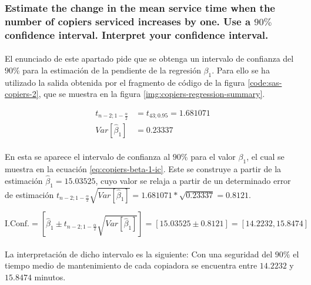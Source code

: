 \documentclass{article}
\begin{document}
      \subsubsection{Estimate the change in the mean service time when the number of copiers serviced increases by one. Use a $90\%$ confidence interval. Interpret your confidence interval.}
      \label{sec:copiers-2.5a}

        \paragraph{}
        El enunciado de este apartado pide que se obtenga un intervalo de confianza del $90\%$ para la estimación de la pendiente de la regresión $\beta_1$. Para ello se ha utilizado la salida obtenida por el fragmento de código de la figura \ref{code:sas-copiers-2}, que se muestra en la figura \ref{img:copiers-regression-summary}.

        \begin{align}
          t_{n-2;1-\frac{\alpha}{2}} &= t_{43;0.95} = 1.681071\\
          Var\left[\widehat{\beta}_1\right] &= 0.23337
        \end{align}

        \paragraph{}
        En esta se aparece el intervalo de confianza al $90\%$ para el valor $\beta_1$, el cual se muestra en la ecuación \eqref{eq:copiers-beta-1-ic}. Este se construye a partir de la estimación $\widehat{\beta}_1=15.03525$, cuyo valor se relaja a partir de un determinado error de estimación $t_{n-2; 1-\frac{\alpha}{2}} \sqrt{Var\left[ \widehat{\beta}_1 \right]} = 1.681071*\sqrt{0.23337} = 0.8121$.

        \begin{equation}
        \label{eq:copiers-beta-1-ic}
          \text{I.Conf.}
          = \left[\widehat{\beta}_1 \pm t_{n-2;1-\frac{\alpha}{2}}\sqrt{Var\left[\widehat{\beta}_1\right]}\right]
          = \left[15.03525 \pm 0.8121\right]
          = \left[14.2232, 15.8474\right]
        \end{equation}

        \paragraph{}
        La interpretación de dicho intervalo es la siguiente: Con una seguridad del $90\%$ el tiempo medio de mantenimiento de cada copiadora se encuentra entre $14.2232$ y $15.8474$ minutos.
\end{document}
